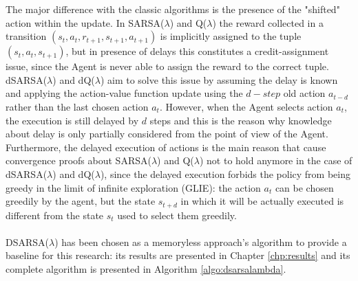                 The major difference with the classic algorithms is the presence of the "shifted" action within the update. In SARSA($\lambda$) and Q($\lambda$) the reward collected in a transition $(s_t, a_t, r_{t+1}, s_{t+1}, a_{t+1})$ is implicitly assigned to the tuple $(s_t, a_t, s_{t+1})$, but in presence of delays this constitutes a credit-assignment issue, since the Agent is never able to assign the reward to the correct tuple. dSARSA($\lambda$) and dQ($\lambda$) aim to solve this issue by assuming the delay is known and applying the action-value function update using the $d-step$ old action $a_{t-d}$ rather than the last chosen action $a_t$.\newline
                However, when the Agent selects action $a_t$, the execution is still delayed by $d$ steps and this is the reason why knowledge about delay is only partially considered from the point of view of the Agent. Furthermore, the delayed execution of actions is the main reason that cause convergence proofs about SARSA($\lambda$) and Q($\lambda$) not to hold anymore in the case of dSARSA($\lambda$) and dQ($\lambda$), since the delayed execution forbids the policy from being greedy in the limit of infinite exploration (GLIE): the action $a_t$ can be chosen greedily by the agent, but the state $s_{t+d}$ in which it will be actually executed is different from the state $s_t$ used to select them greedily. 
                \\\\
                DSARSA($\lambda$) has been chosen as a memoryless approach's algorithm to provide a baseline for this research: its results are presented in Chapter \ref{chp:results} and its complete algorithm is presented in Algorithm \ref{algo:dsarsalambda}.
                
